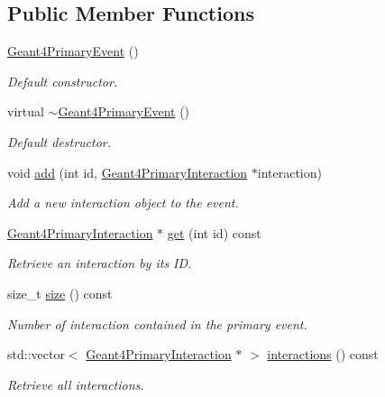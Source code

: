 \subsection*{Public Member Functions}
\begin{DoxyCompactItemize}
\item 
\hyperlink{class_d_d4hep_1_1_simulation_1_1_geant4_primary_event_aa17acb393dfaa92967d7f3f7779807cf}{Geant4\+Primary\+Event} ()
\begin{DoxyCompactList}\small\item\em Default constructor. \end{DoxyCompactList}\item 
virtual \hyperlink{class_d_d4hep_1_1_simulation_1_1_geant4_primary_event_ab4ddee2fb079f7b48eaabd24cbe8b021}{$\sim$\+Geant4\+Primary\+Event} ()
\begin{DoxyCompactList}\small\item\em Default destructor. \end{DoxyCompactList}\item 
void \hyperlink{class_d_d4hep_1_1_simulation_1_1_geant4_primary_event_ae18431e26176abdd03ddbcd4b4097605}{add} (int id, \hyperlink{class_d_d4hep_1_1_simulation_1_1_geant4_primary_interaction}{Geant4\+Primary\+Interaction} $\ast$interaction)
\begin{DoxyCompactList}\small\item\em Add a new interaction object to the event. \end{DoxyCompactList}\item 
\hyperlink{class_d_d4hep_1_1_simulation_1_1_geant4_primary_interaction}{Geant4\+Primary\+Interaction} $\ast$ \hyperlink{class_d_d4hep_1_1_simulation_1_1_geant4_primary_event_ad409e46a1d08c8302033c81cc3e52e3d}{get} (int id) const
\begin{DoxyCompactList}\small\item\em Retrieve an interaction by it\textquotesingle{}s ID. \end{DoxyCompactList}\item 
size\+\_\+t \hyperlink{class_d_d4hep_1_1_simulation_1_1_geant4_primary_event_a69e4706799f5256b3bed56d67b7a9357}{size} () const
\begin{DoxyCompactList}\small\item\em Number of interaction contained in the primary event. \end{DoxyCompactList}\item 
std\+::vector$<$ \hyperlink{class_d_d4hep_1_1_simulation_1_1_geant4_primary_interaction}{Geant4\+Primary\+Interaction} $\ast$ $>$ \hyperlink{class_d_d4hep_1_1_simulation_1_1_geant4_primary_event_affa234ba961fcfd0c48d5b352c2a5e00}{interactions} () const
\begin{DoxyCompactList}\small\item\em Retrieve all interactions. \end{DoxyCompactList}\end{DoxyCompactItemize}
